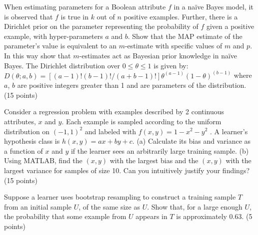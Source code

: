 \documentclass[fleqn]{homework}
\begin{document}
  \begin{problem}{2}
    \begin{question}
      When estimating parameters for a Boolean attribute $f$ in a na\"ive Bayes
      model, it is observed that $f$ is true in $k$ out of $n$ positive
      examples. Further, there is a Dirichlet prior on the parameter
      representing the probability of $f$ given a positive example, with
      hyper-parameters $a$ and $b$. Show that the MAP estimate of the
      parameter’s value is equivalent to an $m$-estimate with specific values of
      $m$ and $p$. In this way show that $m$-estimates act as Bayesian prior
      knowledge in na\"ive Bayes. The Dirichlet distribution over
      $0 \le \theta \le 1$ is given by:
      $D(\theta;a,b)=[(a-1)! (b-1)! /(a+b-1)!] \theta^{(a-1)} (1-
      \theta)^{(b-1)}$
      where $a$, $b$ are positive integers greater than 1 and are parameters of
      the distribution. (15 points)
    \end{question}
  \end{problem}

  \begin{problem}{3}
    \begin{question}
      Consider a regression problem with examples described by 2 continuous
      attributes, $x$ and $y$.  Each example is sampled according to the uniform
      distribution on $(-1,1)^2$ and labeled with $f(x,y)=1 - x^2 - y^2$ . A
      learner’s hypothesis class is $h(x,y)=ax+by+c$. (a) Calculate its bias and
      variance as a function of $x$ and $y$ if the learner sees an arbitrarily
      large training sample. (b) Using MATLAB, find the $(x,y)$ with the largest
      bias and the $(x,y)$ with the largest variance for samples of size 10. Can
      you intuitively justify your findings? (15 points)
    \end{question}
  \end{problem}

  \begin{problem}{4}
    \begin{question}
      Suppose a learner uses bootstrap resampling to construct a training sample
      $T$ from an initial sample $U$, of the same size as $U$. Show that, for a
      large enough $U$, the probability that some example from $U$ appears in
      $T$ is approximately 0.63. (5 points)
    \end{question}
  \end{problem}
\end{document}
